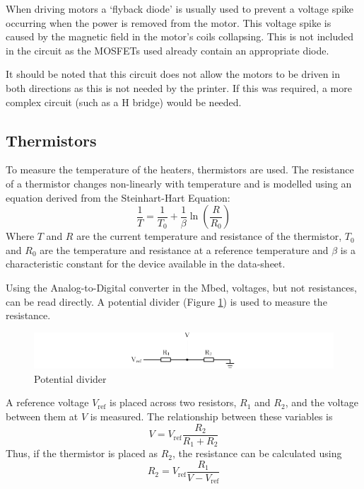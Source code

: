 			When driving motors a `flyback diode' is usually used to prevent a
			voltage spike occurring when the power is removed from the motor. This
			voltage spike is caused by the magnetic field in the motor's coils
			collapsing. This is not included in the circuit as the MOSFETs used
			already contain an appropriate diode.
			
			It should be noted that this circuit does not allow the motors to be
			driven in both directions as this is not needed by the printer. If this
			was required, a more complex circuit (such as a H bridge) would be
			needed.
		
		\subsection{Thermistors}
			
			\label{sec:thermistor}
			
			To measure the temperature of the heaters, thermistors are used. The
			resistance of a thermistor changes non-linearly with temperature and is
			modelled using an equation derived from the Steinhart-Hart
			Equation\cite{Steinhart1968497}:
			\begin{equation}
				\frac{1}{T} = \frac{1}{T_0} + \frac{1}{\beta} \ln \left( \frac{R}{R_0} \right)
				\label{equ:steinhart}
			\end{equation}
			Where $T$ and $R$ are the current temperature and resistance of the
			thermistor, $T_0$ and $R_0$ are the temperature and resistance at a
			reference temperature and $\beta$ is a characteristic constant for the
			device available in the data-sheet.
			
			Using the Analog-to-Digital converter in the Mbed, voltages, but not
			resistances, can be read directly. A potential divider (Figure
			\ref{fig:potentialDiv}) is used to measure the resistance.
			\begin{figure}
				\includegraphics[width=1\textwidth]{diagrams/potentialDiv.pdf}
				\caption{Potential divider}
				\label{fig:potentialDiv}
			\end{figure}
			A reference voltage $V_\textrm{ref}$ is placed across two resistors,
			$R_1$ and $R_2$, and the voltage between them at $V$ is measured. The
			relationship between these variables is
			\begin{equation}
				V = V_\textrm{ref} \frac{R_2}{R_1 + R_2}
			\end{equation}
			Thus, if the thermistor is placed as $R_2$, the resistance can be
			calculated using
			\begin{equation}
				R_2 = V_\textrm{ref} \frac{R_1}{V - V_\textrm{ref}}
				\label{equ:potdiv}
			\end{equation}
			
